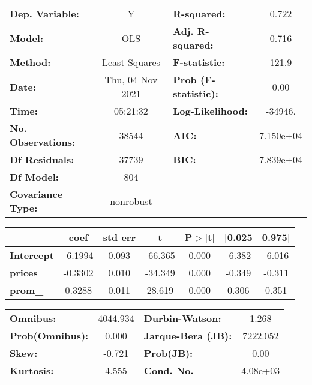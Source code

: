 \begin{center}
\begin{tabular}{lclc}
\toprule
\textbf{Dep. Variable:}                 &        Y         & \textbf{  R-squared:         } &     0.722   \\
\textbf{Model:}                         &       OLS        & \textbf{  Adj. R-squared:    } &     0.716   \\
\textbf{Method:}                        &  Least Squares   & \textbf{  F-statistic:       } &     121.9   \\
\textbf{Date:}                          & Thu, 04 Nov 2021 & \textbf{  Prob (F-statistic):} &     0.00    \\
\textbf{Time:}                          &     05:21:32     & \textbf{  Log-Likelihood:    } &   -34946.   \\
\textbf{No. Observations:}              &       38544      & \textbf{  AIC:               } & 7.150e+04   \\
\textbf{Df Residuals:}                  &       37739      & \textbf{  BIC:               } & 7.839e+04   \\
\textbf{Df Model:}                      &         804      & \textbf{                     } &             \\
\textbf{Covariance Type:}               &    nonrobust     & \textbf{                     } &             \\
\bottomrule
\end{tabular}
\begin{tabular}{lcccccc}
                                        & \textbf{coef} & \textbf{std err} & \textbf{t} & \textbf{P$> |$t$|$} & \textbf{[0.025} & \textbf{0.975]}  \\
\midrule
\textbf{Intercept}                      &      -6.1994  &        0.093     &   -66.365  &         0.000        &       -6.382    &       -6.016     \\
\textbf{prices}                         &      -0.3302  &        0.010     &   -34.349  &         0.000        &       -0.349    &       -0.311     \\
\textbf{prom\_}                         &       0.3288  &        0.011     &    28.619  &         0.000        &        0.306    &        0.351     \\
\bottomrule
\end{tabular}
\begin{tabular}{lclc}
\textbf{Omnibus:}       & 4044.934 & \textbf{  Durbin-Watson:     } &    1.268  \\
\textbf{Prob(Omnibus):} &   0.000  & \textbf{  Jarque-Bera (JB):  } & 7222.052  \\
\textbf{Skew:}          &  -0.721  & \textbf{  Prob(JB):          } &     0.00  \\
\textbf{Kurtosis:}      &   4.555  & \textbf{  Cond. No.          } & 4.08e+03  \\
\bottomrule
\end{tabular}
\end{center}

